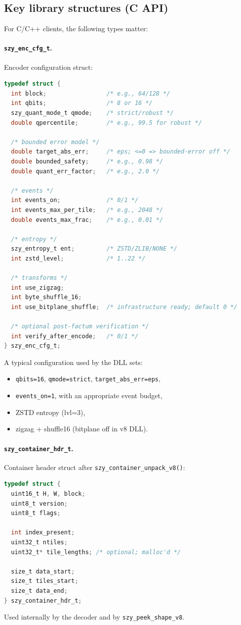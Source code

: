 \documentclass[11pt,a4paper]{article}
\begin{document}
\subsection{Key library structures (C API)}
For C/C++ clients, the following types matter:

\paragraph{\texttt{szy\_enc\_cfg\_t}.}
Encoder configuration struct:
\begin{lstlisting}[style=cstyle,language=C]
typedef struct {
  int block;                 /* e.g., 64/128 */
  int qbits;                 /* 8 or 16 */
  szy_quant_mode_t qmode;    /* strict/robust */
  double qpercentile;        /* e.g., 99.5 for robust */

  /* bounded error model */
  double target_abs_err;     /* eps; <=0 => bounded-error off */
  double bounded_safety;     /* e.g., 0.98 */
  double quant_err_factor;   /* e.g., 2.0 */

  /* events */
  int events_on;             /* 0/1 */
  int events_max_per_tile;   /* e.g., 2048 */
  double events_max_frac;    /* e.g., 0.01 */

  /* entropy */
  szy_entropy_t ent;         /* ZSTD/ZLIB/NONE */
  int zstd_level;            /* 1..22 */

  /* transforms */
  int use_zigzag;
  int byte_shuffle_16;
  int use_bitplane_shuffle;  /* infrastructure ready; default 0 */

  /* optional post-factum verification */
  int verify_after_encode;   /* 0/1 */
} szy_enc_cfg_t;
\end{lstlisting}
A typical configuration used by the DLL sets:
\begin{itemize}
  \item \texttt{qbits=16}, \texttt{qmode=strict}, \texttt{target\_abs\_err=eps},
  \item \texttt{events\_on=1}, with an appropriate event budget,
  \item ZSTD entropy (lvl=3),
  \item zigzag + shuffle16 (bitplane off in v8 DLL).
\end{itemize}

\paragraph{\texttt{szy\_container\_hdr\_t}.}
Container header struct after \texttt{szy\_container\_unpack\_v8()}:
\begin{lstlisting}[style=cstyle,language=C]
typedef struct {
  uint16_t H, W, block;
  uint8_t version;
  uint8_t flags;

  int index_present;
  uint32_t ntiles;
  uint32_t* tile_lengths; /* optional; malloc'd */

  size_t data_start;
  size_t tiles_start;
  size_t data_end;
} szy_container_hdr_t;
\end{lstlisting}
Used internally by the decoder and by \texttt{szy\_peek\_shape\_v8}.
\end{document}
